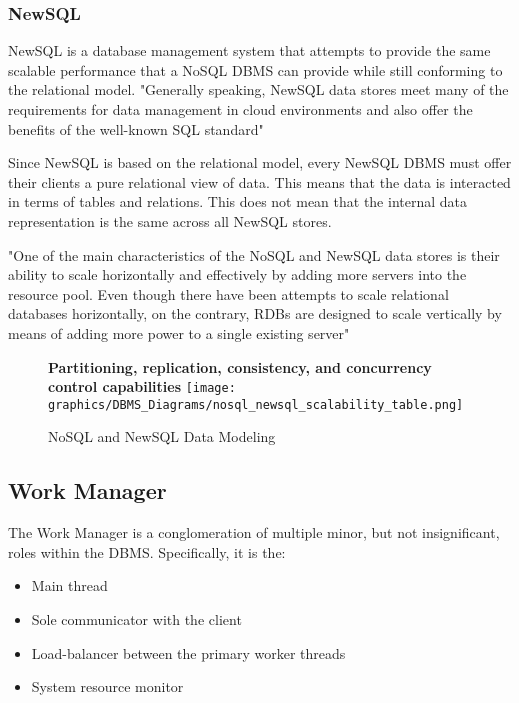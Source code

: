 \documentclass[letterpaper, 12pt]{article}
\renewcommand{\includegraphics}[2][]{\fbox{}}
\begin{document}
\subsubsection{NewSQL}
NewSQL is a database management system that attempts to provide
the same scalable performance that a NoSQL DBMS can provide while still conforming to 
the relational model. "Generally speaking, NewSQL data stores meet many of the 
requirements for data management in cloud environments and also offer the benefits of 
the well-known SQL standard"\cite{grolinger2013data}
\par\vspace{\baselineskip}
Since NewSQL is based on the relational model, every NewSQL DBMS must offer their clients
a pure relational view of data. This means that the data is interacted in terms of tables
and relations. This does not mean that the internal data representation is the same across
all NewSQL stores. 
\par\vspace{\baselineskip}
"One of the main characteristics of the NoSQL and NewSQL data stores is their ability to 
scale horizontally and effectively by adding more servers into the resource pool. Even 
though there have been attempts to scale relational databases horizontally, on the contrary, 
RDBs are designed to scale vertically by means of adding more power to a single existing 
server"\cite{grolinger2013data}

\begin{figure}
  \textbf{Partitioning, replication, consistency, and concurrency control capabilities}
  \texttt{[image: graphics/DBMS\_Diagrams/nosql\_newsql\_scalability\_table.png]}
  \caption{NoSQL and NewSQL Data Modeling}
\end{figure}

\newpage

\subsection{Work Manager}
The Work Manager is a conglomeration of multiple minor, but not insignificant, roles
within the DBMS. Specifically, it is the:
\begin{itemize}
  \item Main thread
  \item Sole communicator with the client
  \item Load-balancer between the primary worker threads
  \item System resource monitor
\end{itemize}
\end{document}
